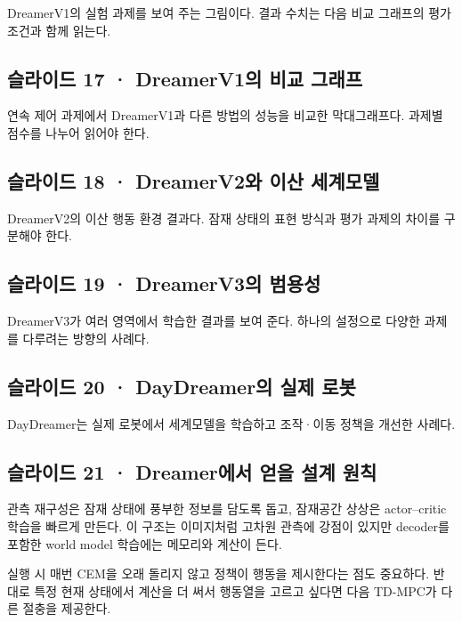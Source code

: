 \documentclass[11pt,a4paper]{article}
\begin{document}
DreamerV1의 실험 과제를 보여 주는 그림이다. 결과 수치는 다음 비교 그래프의 평가 조건과 함께 읽는다.\par

\subsection{슬라이드 17 · DreamerV1의 비교 그래프}

연속 제어 과제에서 DreamerV1과 다른 방법의 성능을 비교한 막대그래프다. 과제별 점수를 나누어 읽어야 한다.\par

\subsection{슬라이드 18 · DreamerV2와 이산 세계모델}

DreamerV2의 이산 행동 환경 결과다. 잠재 상태의 표현 방식과 평가 과제의 차이를 구분해야 한다.\par

\subsection{슬라이드 19 · DreamerV3의 범용성}

DreamerV3가 여러 영역에서 학습한 결과를 보여 준다. 하나의 설정으로 다양한 과제를 다루려는 방향의 사례다.\par

\subsection{슬라이드 20 · DayDreamer의 실제 로봇}

DayDreamer는 실제 로봇에서 세계모델을 학습하고 조작·이동 정책을 개선한 사례다.\par

\subsection{슬라이드 21 · Dreamer에서 얻을 설계 원칙}

관측 재구성은 잠재 상태에 풍부한 정보를 담도록 돕고, 잠재공간 상상은 actor–critic 학습을 빠르게 만든다. 이 구조는 이미지처럼 고차원 관측에 강점이 있지만 decoder를 포함한 world model 학습에는 메모리와 계산이 든다.\par

실행 시 매번 CEM을 오래 돌리지 않고 정책이 행동을 제시한다는 점도 중요하다. 반대로 특정 현재 상태에서 계산을 더 써서 행동열을 고르고 싶다면 다음 TD-MPC가 다른 절충을 제공한다.\par
\end{document}
